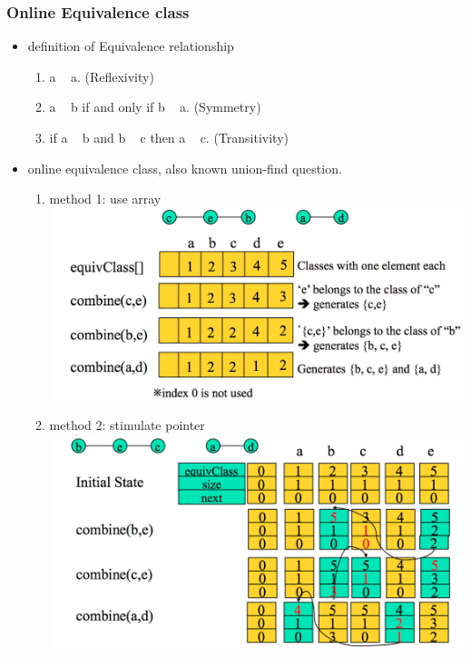 \documentclass[a4paper,12pt,twoside]{book}
\begin{document}
\subsubsection{Online Equivalence class}
\begin{itemize}
\item definition of Equivalence relationship
\begin{enumerate}
\item a ~ a. (Reflexivity)
\item a ~ b if and only if b ~ a. (Symmetry)
\item if a ~ b and b ~ c then a ~ c. (Transitivity)
\end{enumerate}

\item online equivalence class, also known union-find question.  
\begin{enumerate}
\item method 1: use array  \newline 
\includegraphics[scale=0.55]{pics/online_1.png} 

\item method 2: stimulate pointer \newline 
\includegraphics[scale=0.55]{pics/online_2.png}  
\end{enumerate}

\end{itemize}
\end{document}
